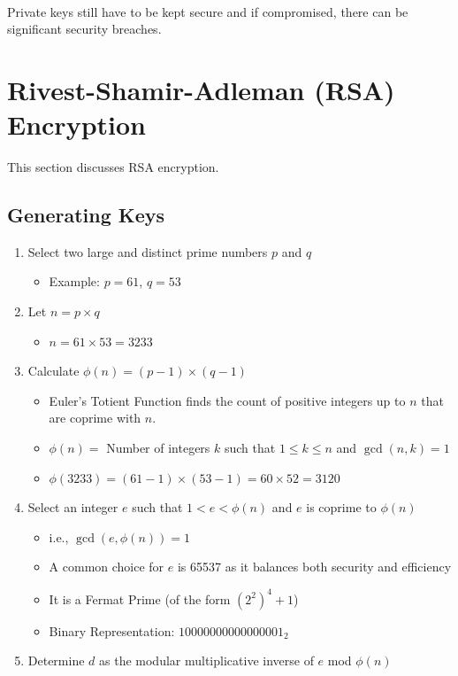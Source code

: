 \documentclass[11pt]{article}
\begin{document}
\

Private keys still have to be kept secure and if compromised, there can be significant security breaches. 


\section{Rivest-Shamir-Adleman (RSA) Encryption}
This section discusses RSA encryption.

\subsection{Generating Keys}
\begin{enumerate}
    \item Select two large and distinct prime numbers $p$ and $q$
    \begin{itemize}
        \item Example: $p = 61$, $q = 53$
    \end{itemize}
    \item Let $n = p \times q$
    \begin{itemize}
        \item $n = 61 \times 53 = 3233$
    \end{itemize}
    \item Calculate $\phi(n) = (p-1) \times (q-1)$
    \begin{itemize}
        \item Euler's Totient Function finds the count of positive integers up to $n$ that are coprime with $n$.
        \item $\phi(n) = $ Number of integers $k$ such that $1 \leq k \leq n$ and $\gcd(n,k) = 1$
        \item $\phi(3233) = (61-1) \times (53-1) = 60 \times 52 = 3120$
    \end{itemize}
    \item Select an integer $e$ such that $1 < e < \phi(n)$ and $e$ is coprime to $\phi(n)$
    \begin{itemize}
        \item i.e., $\gcd(e,\phi(n)) = 1$
        \item A common choice for $e$ is 65537 as it balances both security and efficiency
        \item It is a Fermat Prime (of the form $(2^2)^4 + 1$)
        \item Binary Representation: $10000000000000001_2$
    \end{itemize}
    \item Determine $d$ as the modular multiplicative inverse of $e$ mod $\phi(n)$

\end{enumerate}
\end{document}
